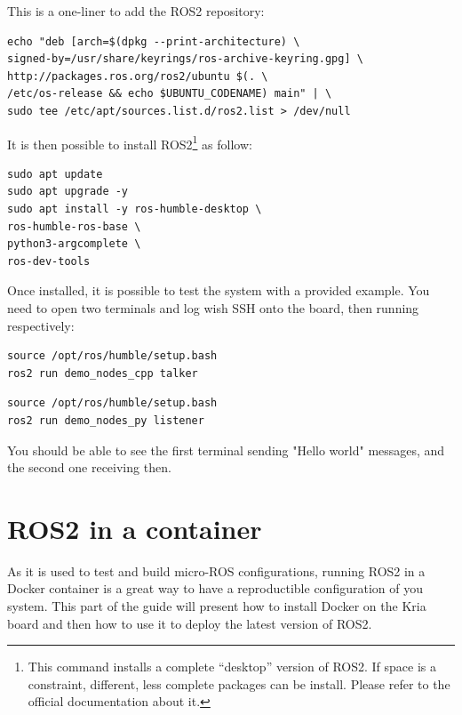 \documentclass[10pt]{article}
\begin{document}
This is a one-liner to add the ROS2 repository:

\begin{tcolorbox}
\begin{verbatim}
echo "deb [arch=$(dpkg --print-architecture) \
signed-by=/usr/share/keyrings/ros-archive-keyring.gpg] \
http://packages.ros.org/ros2/ubuntu $(. \
/etc/os-release && echo $UBUNTU_CODENAME) main" | \
sudo tee /etc/apt/sources.list.d/ros2.list > /dev/null
\end{verbatim}
\end{tcolorbox}

It is then possible to install ROS2\footnote{This command installs a complete ``desktop'' version of ROS2. If space is a constraint, different, less complete packages can be install. Please refer to the official documentation about it.} as follow:

\begin{tcolorbox}
\begin{verbatim}
sudo apt update
sudo apt upgrade -y
sudo apt install -y ros-humble-desktop \
ros-humble-ros-base \
python3-argcomplete \
ros-dev-tools
\end{verbatim}
\end{tcolorbox}

Once installed, it is possible to test the system with a provided example. You need to open two terminals and log wish SSH onto the board, then running respectively:

\begin{tcolorbox}
\begin{verbatim}
source /opt/ros/humble/setup.bash
ros2 run demo_nodes_cpp talker
\end{verbatim}
\end{tcolorbox}



\begin{tcolorbox}
\begin{verbatim}
source /opt/ros/humble/setup.bash
ros2 run demo_nodes_py listener
\end{verbatim}
\end{tcolorbox}


You should be able to see the first terminal sending "Hello world" messages, and the second one receiving then.

\section{ROS2 in a container}
\label{sec:ros2-container}
As it is used to test and build micro-ROS configurations, running ROS2 in a Docker container is a great way to have a reproductible configuration
of you system. This part of the guide will present how to install Docker on the Kria board and then how to use it to deploy the latest
version of ROS2.
\end{document}
